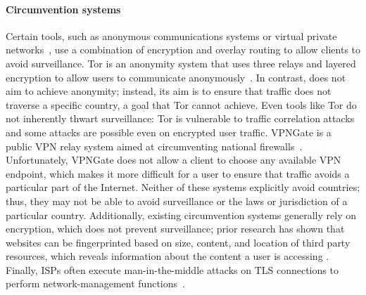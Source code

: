 \paragraph{Circumvention systems}  Certain tools, such as anonymous
communications systems or virtual private networks~\cite{dingledine2004tor,nobori2014vpn,piotrowska2017loopix,van2015vuvuzela,wolinsky2012dissent,tyagi2016stadium,corrigan2015riposte,kwon2016atom,kwon2016riffle,
gelernter2016two}, use a combination of
encryption and overlay routing to allow clients to avoid surveillance. Tor is
an anonymity system that uses three relays and layered encryption to allow
users to communicate anonymously~\cite{dingledine2004tor}.  In contrast,
\system{} does not aim to achieve anonymity; instead, its aim is to ensure
that traffic does not traverse a specific  country, a goal that Tor cannot
achieve.  Even tools like Tor do not inherently thwart surveillance: Tor is
vulnerable to traffic correlation attacks and some attacks are possible even
on encrypted user traffic. VPNGate is a public VPN relay system aimed at
circumventing national firewalls~\cite{nobori2014vpn}. Unfortunately, VPNGate
does not allow a client to choose any available VPN endpoint, which makes it more
difficult for a user to ensure that traffic avoids a particular part of the
Internet.  Neither of these systems explicitly avoid countries; thus, they may
not  be able to avoid surveillance or the laws or jurisdiction of a particular
country. Additionally, existing circumvention systems generally rely on
encryption, which does not prevent surveillance; prior research has shown that
websites can be fingerprinted based on size, content, and location of third
party resources, which  reveals information about the content a user is
accessing \cite{what_isps_can_see}.  Finally, ISPs often execute man-in-the-middle attacks on TLS connections to perform network-management
functions~\cite{mitm_isp}.

